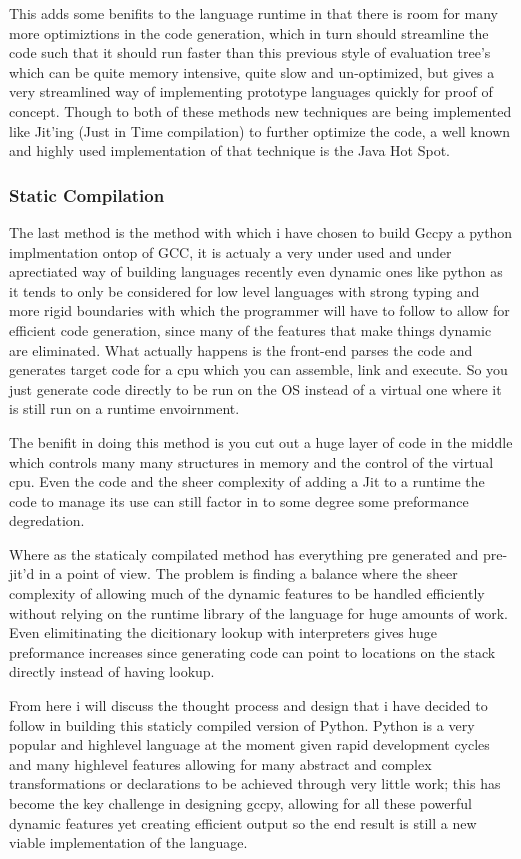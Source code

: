\documentclass[defaultstyle,11pt]{article}
\begin{document}
This adds some benifits to the language runtime in that there is room for many more optimiztions in the code
generation, which in turn should streamline the code such that it should run faster than this previous style 
of evaluation tree's which can be quite memory intensive, quite slow and un-optimized, but gives a very
streamlined way of implementing prototype languages quickly for proof of concept. Though to both of these methods
new techniques are being implemented like Jit'ing (Just in Time compilation) to further optimize the code, a well
known and highly used implementation of that technique is the Java Hot Spot.

\subsubsection{Static Compilation}
The last method is the method with which i have chosen to build Gccpy a python implmentation ontop of GCC,
it is actualy a very under used and under aprectiated way of building languages recently even dynamic ones like
python as it tends to only be considered for low level languages with strong typing and more rigid boundaries with
which the programmer will have to follow to allow for efficient code generation, since many of the features
that make things dynamic are eliminated. What actually happens is the front-end parses the code and generates
target code for a cpu which you can assemble, link and execute. So you just generate code directly to be run on
the OS instead of a virtual one where it is still run on a runtime envoirnment.

The benifit in doing this method is you cut out a huge layer of code
in the middle which controls many many structures in memory and the control of the virtual cpu. Even the code
and the sheer complexity of adding a Jit to a runtime the code to manage its use can still factor in to some
degree some preformance degredation.

Where as the staticaly compilated method has everything pre generated and pre-jit'd in a point of view. The
problem is finding a balance where the sheer complexity of allowing much of the dynamic features to be handled
efficiently without relying on the runtime library of the language for huge amounts of work. Even elimitinating
the dicitionary lookup with interpreters gives huge preformance increases since generating code can point to
locations on the stack directly instead of having lookup.

From here i will discuss the thought process and design that i have decided to follow in building this staticly
compiled version of Python. Python is a very popular and highlevel language at the moment given rapid
development cycles and many highlevel features allowing for many abstract and complex transformations or
declarations to be achieved through very little work; this has become the key challenge in designing gccpy,
allowing for all these powerful dynamic features yet creating efficient output so the end result is still
a new viable implementation of the language.
\end{document}
